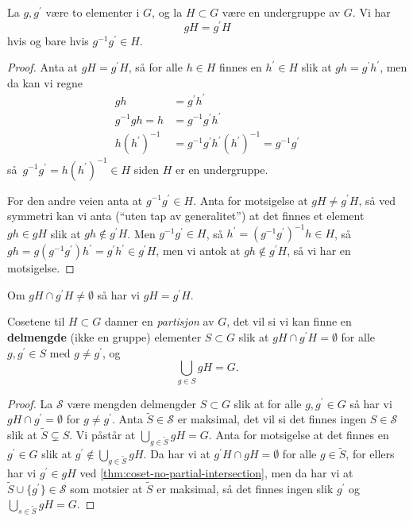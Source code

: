 \begin{lemma}
    La $g, g^\prime$ være to elementer i $G$,
    og la $H\subset G$ være en undergruppe av $G$.
    Vi har
    \[
        gH = g^\prime H
    \]
    hvis og bare hvis $g^{-1} g^\prime\in H$.
\end{lemma}
\begin{proof}
    Anta at $g H = g^\prime H$,
    så for alle $h\in H$ finnes en $h^\prime\in H$
    slik at $gh = g^\prime h^\prime$,
    men da kan vi regne
    \[\begin{aligned}
        gh &= g^\prime h^\prime \\
        g^{-1} gh = h
           &= g^{-1} g^\prime h^\prime \\
        h {(h^\prime)}^{-1}
           &= g^{-1} g^\prime h^\prime {(h^\prime)}^{-1}
            = g^{-1} g^\prime
    \end{aligned}\]
    så $g^{-1}g^\prime = h {(h^\prime)}^{-1}\in H$ siden $H$ er en undergruppe.

    For den andre veien anta at $g^{-1} g^\prime \in H$.
    Anta for motsigelse at $gH\neq g^\prime H$,
    så ved symmetri kan vi anta (``uten tap av generalitet'')
    at det finnes et element $gh\in gH$
    slik at $gh\notin g^\prime H$.
    Men $g^{-1} g^\prime \in H$,
    så $h^\prime = {(g^{-1} g^\prime)}^{-1} h\in H$,
    så $gh = g (g^{-1}g^\prime) h^\prime = g^\prime h^\prime \in g^\prime H$,
    men vi antok at $gh\notin g^\prime H$, så vi har en motsigelse.
\end{proof}

\begin{corollary}\label{thm:coset-no-partial-intersection}
    Om $gH\cap g^\prime H\neq \emptyset$ så har vi $gH = g^\prime H$.
\end{corollary}

\begin{corollary}
    Cosetene til $H\subset G$ danner en \textit{partisjon} av $G$,
    det vil si vi kan finne en \textbf{delmengde} (ikke en gruppe) elementer
    $S\subset G$ slik at $gH \cap g^\prime H = \emptyset$ for alle $g,g^\prime\in S$
    med $g\neq g^\prime$, og
    \[
        \bigcup_{g\in S} gH = G.
    \]
\end{corollary}
\begin{proof}
    La $\mathscr S$ være mengden delmengder $S\subset G$ slik at
    for alle $g,g^\prime \in G$ så har vi $gH\cap g^\prime = \emptyset$
    for $g\neq g^\prime$.
    Anta $\tilde S\in \mathscr S$ er maksimal, det vil si det finnes ingen
    $S\in \mathscr S$ slik at $\tilde S\subsetneq S$.
    Vi påstår at $\bigcup_{g\in \tilde S} gH = G$.
    Anta for motsigelse at det finnes en $g^\prime\in G$ slik at
    $g^\prime\notin \bigcup_{g\in \tilde S} gH$.
    Da har vi at $g^\prime H\cap gH = \emptyset$ for alle $g\in \tilde S$,
    for ellers har vi $g^\prime \in gH$ ved \cref{thm:coset-no-partial-intersection},
    men da har vi at $\tilde S\cup \{g^\prime\}\in\mathscr S$
    som motsier at $\tilde S$ er maksimal,
    så det finnes ingen slik $g^\prime$ og $\bigcup_{s\in\tilde S} gH = G$.
\end{proof}

